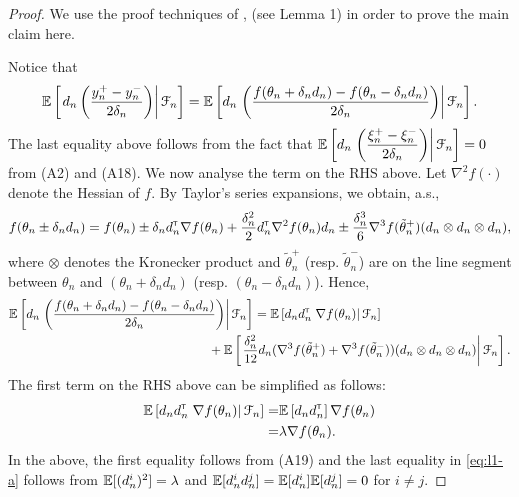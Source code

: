 \begin{proof}
We use the proof techniques of \cite{spall},\cite{prashanth2015rdsa} (see Lemma 1) in order to prove the main claim here.
 
Notice that
\begin{align*}
\mathbb{E}\left[\left. d_n\left(\dfrac{y_n^+ - y_n^-}{2\delta_n}\right) \right| \mathcal{F}_n\right] 
=  \mathbb{E}\left[d_n\left.\left(\dfrac{f(\theta_n+\delta_n d_n) - f(\theta_n-\delta_n d_n)}{2\delta_n}\right) \right| \mathcal{F}_n\right].
\end{align*}
The last equality above follows from the fact that $\mathbb{E}\left[  d_n\left.\left(\dfrac{\xi_n^+ - \xi_n^-}{2\delta_n}\right) \right| \mathcal{F}_n\right]=0$ from (A2) and (A18). We now analyse the term on the RHS above.
Let $\nabla^2 f(\cdot)$ denote the Hessian of $f$.
By Taylor's series expansions, we obtain, a.s.,
\begin{align*}
f(\theta_n \pm \delta_n d_n) = f(\theta_n) \pm \delta_n d_n^\mathsf{\scriptscriptstyle T} \nabla f(\theta_n) + \frac{\delta_n^2}{2} d_n^\mathsf{\scriptscriptstyle T} \nabla^2 f(\theta_n) d_n 
 \pm  \frac{\delta_n^3}{6} \nabla^3 f(\tilde  \theta_n^+)(d_n \otimes d_n \otimes d_n),
\end{align*}
where $\otimes$ denotes the Kronecker product and $\tilde \theta_n^+$ (resp. $\tilde \theta_n^-$) are on the line segment between $\theta_n$ and $(\theta_n + \delta_n d_n)$ (resp. $(\theta_n - \delta_n d_n)$).
Hence,
\begin{align}
&\E\left[d_n\left.\left(\dfrac{f(\theta_n+\delta_n d_n) - f(\theta_n-\delta_n d_n)}{2\delta_n}\right)\right| \F_n \right] 
= \E\left[d_n d_n\tr \left.\nabla f(\theta_n)\right| \F_n\right]\nonumber \\
& \hspace{5.5cm}+   \E\left[\left.\frac{\delta_n^2}{12} d_n (\nabla^3 f(\tilde  \theta_n^+)+\nabla^3 f(\tilde  \theta_n^-))(d_n \otimes d_n \otimes d_n)\right| \F_n\right]. \label{eq:l1}
\end{align}
The first term on the RHS above can be simplified as follows:
\begin{align}
\mathbb{E}\left[d_n d_n^\mathsf{\scriptscriptstyle T} \left.\nabla f(\theta_n)\right| \mathcal{F}_n\right] = &\mathbb{E}\left[d_n d_n^\mathsf{\scriptscriptstyle T} \right] \nabla f(\theta_n) \nonumber\\
= &  \lambda \nabla f(\theta_n). \label{eq:l1-a}
\end{align}
In the above, the first equality follows from (A19) and the last equality in \eqref{eq:l1-a} follows from $\mathbb{E}[(d_n^i)^2] = \lambda$ and $\mathbb{E}[d_n^i d_n^j] = \mathbb{E}[d_n^i] \mathbb{E}[d_n^j] = 0$ for $i\ne j$.


\end{proof}
